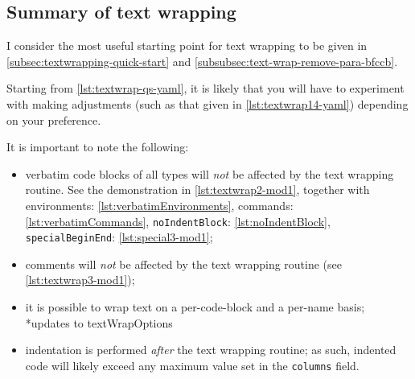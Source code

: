 \subsection{Summary of text wrapping}
	I consider%
	the most useful starting point for text wrapping to be given in
	\cref{subsec:textwrapping-quick-start} and \cref{subsubsec:text-wrap-remove-para-bfccb}.

	Starting from \cref{lst:textwrap-qs-yaml}, it is likely that you will have to experiment
	with making adjustments (such as that given in \cref{lst:textwrap14-yaml}) depending on
	your preference.

	It is important to note the following:
	\begin{itemize}
		\item verbatim code blocks of all types will \emph{not} be affected by the text wrapping
		      routine. See the demonstration in \vref{lst:textwrap2-mod1}, together with environments:
		      \vref{lst:verbatimEnvironments}, commands: \vref{lst:verbatimCommands},
		      \texttt{noIndentBlock}: \cref{lst:noIndentBlock}, \texttt{specialBeginEnd}:
		      \vref{lst:special3-mod1};
		\item comments will \emph{not} be affected by the text wrapping routine (see
		      \vref{lst:textwrap3-mod1});
		\item it is possible to wrap text on a per-code-block and a per-name basis;
		      *{updates to textWrapOptions}
		\item indentation is performed \emph{after} the text wrapping routine; as such, indented code
		      will likely exceed any maximum value set in the \texttt{columns} field.
	\end{itemize}
